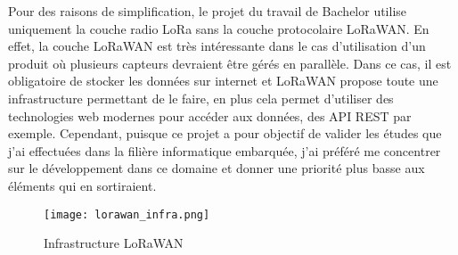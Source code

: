 Pour des raisons de simplification, le projet du travail de Bachelor utilise uniquement la couche radio LoRa sans la couche protocolaire LoRaWAN. En effet, la couche LoRaWAN est très intéressante dans le cas d'utilisation d'un produit où plusieurs capteurs devraient être gérés en parallèle. Dans ce cas, il est obligatoire de stocker les données sur internet et LoRaWAN propose toute une infrastructure permettant de le faire, en plus cela permet d'utiliser des technologies web modernes pour accéder aux données, des API REST par exemple. Cependant, puisque ce projet a pour objectif de valider les études que j'ai effectuées dans la filière informatique embarquée, j'ai préféré me concentrer sur le développement dans ce domaine et donner une priorité plus basse aux éléments qui en sortiraient.

\begin{figure}[htb]
\centering 
\texttt{[image: lorawan\_infra.png]} 
\caption{Infrastructure LoRaWAN}
\label{fig:infra_lorawan}
\end{figure}